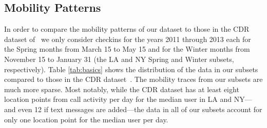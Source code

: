 
\subsection{Mobility Patterns}
\label{sec:mobility-patterns}

In order to compare the mobility patterns of our dataset to those in the CDR dataset of~\cite{Isaacman:2011cn,Isaacman:2010en} we only consider checkins for the years 2011 through 2013 each for the Spring months from March 15 to May 15 and for the Winter months from November 15 to January 31 (the LA and NY Spring and Winter subsets, respectively). Table \ref{tab:basics} shows the distribution of the data in our subsets compared to those in the CDR dataset~\cite{Isaacman:2011cn}. The mobility traces from our subsets are much more sparse. Most notably, while the CDR dataset has at least eight location points from call activity per day for the median user in LA and NY---and even 12 if text messages are added---the data in all of our subsets account for only one location point for the median user per day.


